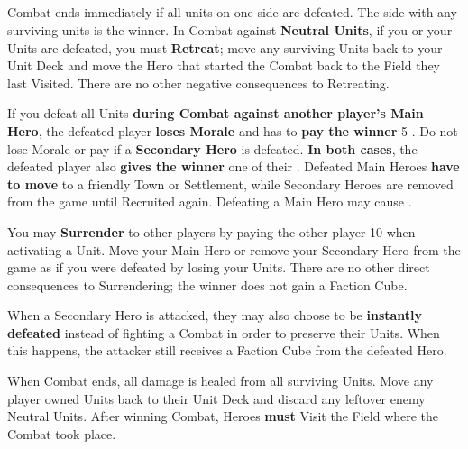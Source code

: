 \begin{multicols}{2}
\subsection*{}
Combat ends immediately if all units on one side are defeated.
The side with any surviving units is the winner.
In Combat against \textbf{Neutral Units}, if you  or your Units are defeated, you must \textbf{Retreat}; move any surviving Units back to your Unit Deck and move the Hero that started the Combat back to the Field they last Visited.
There are no other negative consequences to Retreating.\par
{}\par
If you defeat all Units \textbf{during Combat against another player's Main Hero}, the defeated player \textbf{loses Morale} and has to \textbf{pay the winner} 5 .
Do not lose Morale or pay  if a \textbf{Secondary Hero} is defeated.
\textbf{In both cases}, the defeated player also \textbf{gives the winner} one of their .
Defeated Main Heroes \textbf{have to move} to a friendly Town or Settlement, while Secondary Heroes are removed from the game until Recruited again.
Defeating a Main Hero may cause .\par
You may \textbf{Surrender} to other players by paying the other player 10  when activating a Unit.
Move your Main Hero or remove your Secondary Hero from the game as if you were defeated by losing your Units.
There are no other direct consequences to Surrendering; the winner does not gain a Faction Cube.\par
{}\par
When a Secondary Hero is attacked, they may also choose to be \textbf{instantly defeated} instead of fighting a Combat in order to preserve their Units.
When this happens, the attacker still receives a Faction Cube from the defeated Hero.\par
When Combat ends, all damage is healed from all surviving Units.
Move any player owned Units back to their Unit Deck and discard any leftover enemy Neutral Units.
After winning Combat, Heroes \textbf{must} Visit the Field where the Combat took place.


\end{multicols}
